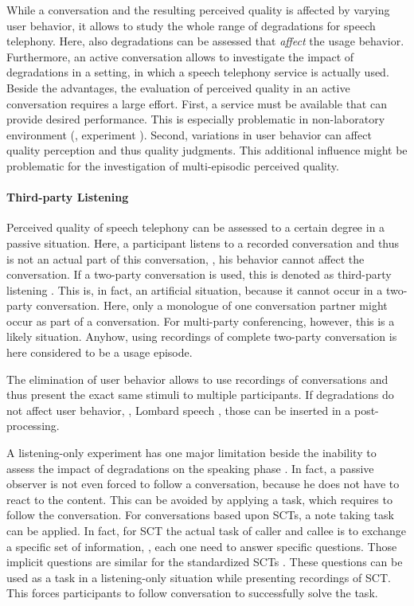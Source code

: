 While a conversation and the resulting perceived quality is affected by varying user behavior, it allows to study the whole range of degradations for speech telephony.
Here, also degradations can be assessed that \emph{affect} the usage behavior. %
Furthermore, an active conversation allows to investigate the impact of degradations in a setting, in which a speech telephony service is actually used.
Beside the advantages, the evaluation of perceived quality in an active conversation requires a large effort.
First, a service must be available that can provide desired performance.
This is especially problematic in non-laboratory environment (\cf, experiment ).
Second, variations in user behavior can affect quality perception and thus quality judgments.
This additional influence might be problematic for the investigation of multi-episodic perceived quality.

\paragraph*{Third-party Listening}
Perceived quality of speech telephony can be assessed  to a certain degree in a passive situation.
Here, a participant listens to a recorded conversation and thus is not an actual part of this conversation, \ie, his behavior cannot affect the conversation.
If a two-party conversation is used, this is denoted as third-party listening \citep[][p.~13]{itu-t_p.832:_2000}.
This is, in fact, an artificial situation, because it cannot occur in a two-party conversation.
Here, only a monologue of one conversation partner might occur as part of a conversation.
For multi-party conferencing, however, this is a likely situation.
Anyhow, using recordings of complete two-party conversation is here considered to be a usage episode.

The elimination of user behavior allows to use recordings of conversations and thus present the exact same stimuli to multiple participants.
If degradations do not affect user behavior, \eg, Lombard speech \citep[][p.~161]{moller_assessment_2000}, those can be inserted in a post-processing.

A listening-only experiment has one major limitation beside the inability to assess the impact of degradations on the speaking phase \citep{gueguin_evaluation_2008}.
In fact, a passive observer is not even forced to follow a conversation, because he does not have to react to the content.
This can be avoided by applying a task, which requires to follow the conversation.
For conversations based upon \acp{SCT}, a note taking task can be applied.
In fact, for \ac{SCT} the actual task of caller and callee is to exchange a specific set of information, \ie, each one need to answer specific questions.
Those implicit questions are similar for the standardized \acp{SCT} \citep{itu-t_p.805:_2007}.
These questions can be used as a task in a listening-only situation while presenting recordings of \ac{SCT}.
This forces participants to follow conversation to successfully solve the task.

